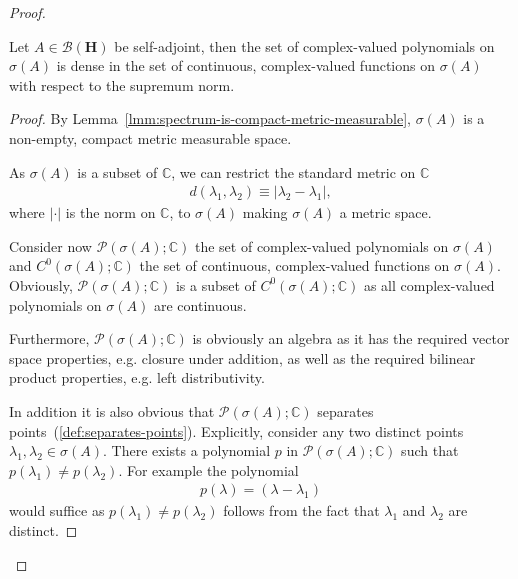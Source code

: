 \begin{proof}
\begin{lemma}
    \label{lmm:lemma-5}
    \leanok
    Let $A \in \mathcal{B}(\mathbf{H})$ be self-adjoint, then the set of complex-valued polynomials on $\sigma(A)$ is dense in the set of continuous, complex-valued functions on $\sigma(A)$ with respect to the supremum norm.
\end{lemma}
\begin{proof}
    \leanok
By Lemma~\ref{lmm:spectrum-is-compact-metric-measurable}, $\sigma(A)$ is a non-empty, compact metric measurable space.

As $\sigma(A)$ is a subset of $\mathbb{C}$, we can restrict the standard metric on $\mathbb{C}$
\begin{align}
    d(\lambda_1, \lambda_2) \equiv \lvert \lambda_2 - \lambda_1 \rvert,
\end{align}
where $\lvert \cdot \rvert$ is the norm on $\mathbb{C}$, to $\sigma(A)$ making $\sigma(A)$ a metric space.

Consider now $\mathcal{P}(\sigma(A); \mathbb{C})$ the set of complex-valued polynomials on $\sigma(A)$ and $C^0(\sigma(A); \mathbb{C})$ the set of continuous, complex-valued functions on $\sigma(A)$. Obviously, $\mathcal{P}(\sigma(A); \mathbb{C})$ is a subset of $C^0(\sigma(A); \mathbb{C})$ as all complex-valued polynomials on $\sigma(A)$ are continuous.

Furthermore, $\mathcal{P}(\sigma(A); \mathbb{C})$ is obviously an algebra as it has the required vector space properties, e.g. closure under addition, as well as the required bilinear product properties, e.g. left distributivity.

In addition it is also obvious that $\mathcal{P}(\sigma(A); \mathbb{C})$ separates points~(\ref{def:separates-points}). Explicitly, consider any two distinct points $\lambda_1, \lambda_2 \in \sigma(A)$. There exists a polynomial $p$ in $\mathcal{P}(\sigma(A); \mathbb{C})$ such that $p(\lambda_1) \neq p(\lambda_2)$. For example the polynomial
\begin{align}
    p(\lambda) = (\lambda - \lambda_1)
\end{align}
would suffice as $p(\lambda_1) \neq p(\lambda_2)$ follows from the fact that $\lambda_1$ and $\lambda_2$ are distinct.


\end{proof}
\end{proof}
